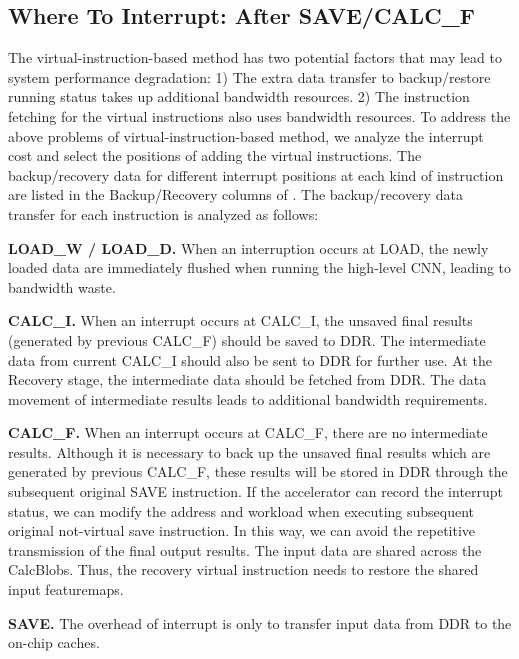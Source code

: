 \subsection{ Where To Interrupt: After SAVE/CALC\_F }
\label{sec:whereinter}
The virtual-instruction-based method has two potential factors that may lead to system performance degradation: 1) The extra data transfer to backup/restore running status takes up additional bandwidth resources. 2) The instruction fetching for the virtual instructions also uses bandwidth resources.
To address the above problems of virtual-instruction-based method, we analyze the interrupt cost and select the positions of adding the virtual instructions.
The backup/recovery data for different interrupt positions at each kind of instruction are listed in the Backup/Recovery columns of . The backup/recovery data transfer for each instruction is analyzed as follows:

\textbf{LOAD\_W / LOAD\_D. }
When an interruption occurs at LOAD, the newly loaded data are immediately flushed when running the high-level CNN, leading to bandwidth waste.

\textbf{CALC\_I.} 
When an interrupt occurs at CALC\_I, the unsaved final results (generated by previous CALC\_F) should be saved to DDR. The intermediate data from current CALC\_I should also be sent to DDR for further use. At the Recovery stage, the intermediate data should be fetched from DDR. The data movement of intermediate results leads to additional bandwidth requirements.


\textbf{CALC\_F.}
When an interrupt occurs at CALC\_F, there are no intermediate results. 
Although it is necessary to back up the unsaved final results which are generated by previous CALC\_F, these results will be stored in DDR through the subsequent original SAVE instruction.
If the accelerator can record the interrupt status, we can modify the address and workload when executing subsequent original not-virtual save instruction.
In this way, we can avoid the repetitive transmission of the final output results.
The input data are shared across the CalcBlobs. Thus, the recovery virtual instruction needs to restore the shared input featuremaps.



\textbf{SAVE.}
The overhead of interrupt is only to transfer input data from DDR to the on-chip caches. 

